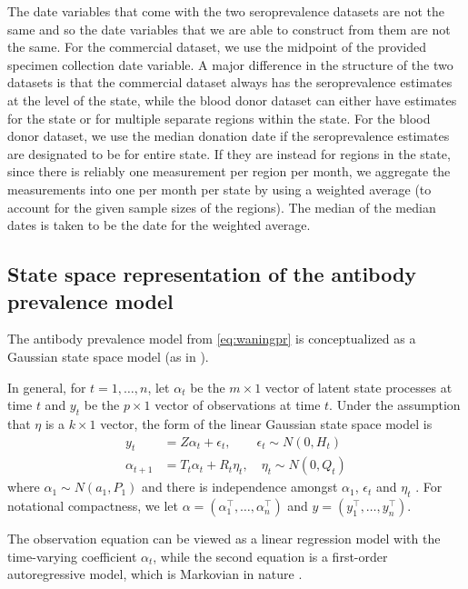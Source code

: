 \documentclass{article}
\begin{document}
The date variables that come with the two seroprevalence datasets are not the same
and so the date variables that we are able to construct from them are not the
same. For the commercial dataset, we use the midpoint of the provided specimen
collection date variable. A major difference in the structure of the two
datasets is that the commercial dataset always has the seroprevalence estimates
at the level of the state, while the blood donor dataset can either have
estimates for the state or for multiple separate regions within the state. For
the blood donor dataset, we use the median donation date if the seroprevalence
estimates are designated to be for entire state. If they are instead for regions
in the state, since there is reliably one measurement per region per month, we
aggregate the measurements into one per month per state by using a weighted
average (to account for the given sample sizes of the regions). The median of
the median dates is taken to be the date for the weighted average.


\subsection{State space representation of the antibody prevalence model}\label{supp:ssapm} 

The antibody prevalence model from \autoref{eq:waningpr} is conceptualized
as a Gaussian state space model (as in \citealp{durbin2012time, helske2017kfas}).

In general, for $t = 1, \dots, n$, let $\alpha_t$ be the $m \times 1$ vector of latent
state processes at time $t$ and $y_t$ be the $p \times 1$ vector of observations
at time $t$. Under the assumption that $\eta$ is a $k \times 1$ vector, the
form of the linear Gaussian state space model is 
\begin{align}
y_t &= Z\alpha_t + \epsilon_t, \qquad \epsilon_t \sim N(0, H_t) \label{eq:ss1}\\
\alpha_{t+1} &= T_t\alpha_t + R_t\eta_t, \quad \eta_t \sim N(0, Q_t) \label{eq:ss2}
\end{align}
where $\alpha_1 \sim N(a_1, P_1)$ and 
there is independence amongst $\alpha_1$, $\epsilon_t$ and $\eta_t$
\citep{helske2017kfas, durbin2012time}. For notational
compactness, we let $\alpha = \left ( \alpha_1^\top, \dots, \alpha_n^\top \right )$
and $y = \left ( y_1^\top, \dots, y_n^\top \right )$.

The observation equation can be viewed as a linear regression model with the
time-varying coefficient $\alpha_t$, while the second equation is a first-order
autoregressive model, which is Markovian in nature \citep{durbin2012time}. 
\end{document}
